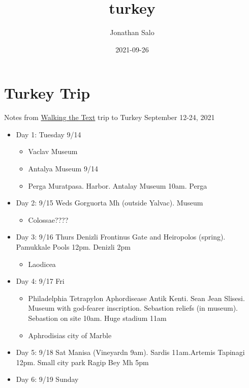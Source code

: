 \documentclass[
]{book}
\title{turkey}
\author{Jonathan Salo}
\date{2021-09-26}
\providecommand{\tightlist}{%
  \setlength{\itemsep}{0pt}\setlength{\parskip}{0pt}}
\begin{document}
\maketitle

{
\setcounter{tocdepth}{1}
\tableofcontents
}
\hypertarget{turkey-trip}{%
\chapter{Turkey Trip}\label{turkey-trip}}

Notes from \href{http://walkingthetestcom}{Walking the Text} trip to Turkey September 12-24, 2021

\begin{itemize}
\tightlist
\item
  Day 1: Tuesday 9/14

  \begin{itemize}
  \tightlist
  \item
    Vaclav Museum
  \item
    Antalya Museum 9/14\\
  \item
    Perga Muratpasa. Harbor. Antalay Museum 10am. Perga
  \end{itemize}
\item
  Day 2: 9/15 Weds Gorguorta Mh (outside Yalvac). Museum

  \begin{itemize}
  \tightlist
  \item
    Colossae????
  \end{itemize}
\item
  Day 3: 9/16 Thurs Denizli Frontinus Gate and Heiropolos (spring). Pamukkale Pools 12pm. Denizli 2pm

  \begin{itemize}
  \tightlist
  \item
    Laodicea
  \end{itemize}
\item
  Day 4: 9/17 Fri

  \begin{itemize}
  \tightlist
  \item
    Philadelphia
    Tetrapylon Aphordisease Antik Kenti. Sean Jean Slisesi. Museum with god-fearer inscription. Sebastion reliefs (in museum). Sebastion on site 10am. Huge stadium 11am
  \item
    Aphrodisias city of Marble
  \end{itemize}
\item
  Day 5: 9/18 Sat Manisa (Vineyardn 9am). Sardis 11am.Artemis Tapinagi 12pm. Small city park Ragip Bey Mh 5pm
\item
  Day 6: 9/19 Sunday


\end{itemize}
\end{document}
